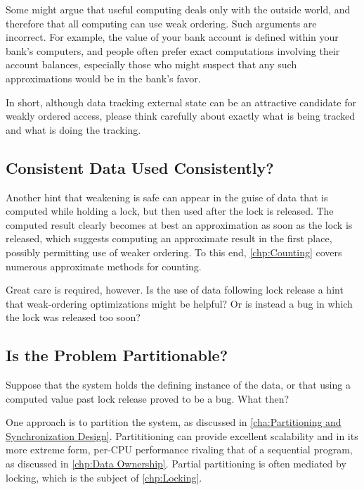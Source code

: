 Some might argue that useful computing deals only with the outside world,
and therefore that all computing can use weak ordering.
Such arguments are incorrect.
For example, the value of your bank account is defined within your
bank's computers, and people often prefer exact computations involving
their account balances, especially those who might suspect that any such
approximations would be in the bank's favor.

In short, although data tracking external state can be an attractive
candidate for weakly ordered access, please think carefully about
exactly what is being tracked and what is doing the tracking.

\subsection{Consistent Data Used Consistently?}
\label{sec:app:questions:Consistent Data Used Consistently?}

Another hint that weakening is safe can appear in the guise of data
that is computed while holding a lock, but then used after the lock
is released.
The computed result clearly becomes at best an approximation as soon as
the lock is released, which suggests computing an approximate result
in the first place, possibly permitting use of weaker ordering.
To this end, \cref{chp:Counting} covers numerous approximate methods
for counting.

Great care is required, however.
Is the use of data following lock release a hint that weak-ordering
optimizations might be helpful?
Or is instead a bug in which the lock was released too soon?

\subsection{Is the Problem Partitionable?}
\label{sec:app:questions:Is the Problem Partitionable?}

Suppose that the system holds the defining instance of the data,
or that using a computed value past lock release proved to be a bug.
What then?

One approach is to partition the system, as discussed in
\cref{cha:Partitioning and Synchronization Design}.
Partititioning can provide excellent scalability and in its more
extreme form, per-CPU performance rivaling that of a sequential program,
as discussed in \cref{chp:Data Ownership}.
Partial partitioning is often mediated by locking, which is the subject of
\cref{chp:Locking}.

